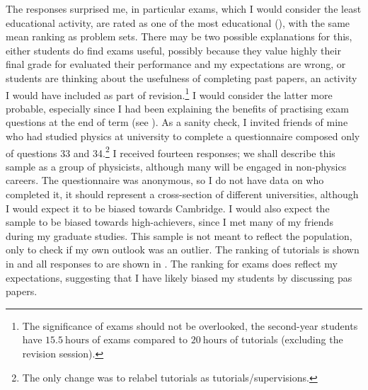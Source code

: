 The responses surprised me, in particular exams, which I would consider the least educational activity, are rated as one of the most educational (), with the same mean ranking as problem sets. There may be two possible explanations for this, either students do find exams useful, possibly because they value highly their final grade for evaluated their performance and my expectations are wrong, or students are thinking about the usefulness of completing past papers, an activity I would have included as part of revision.\footnote{The significance of exams should not be overlooked, the second-year students have $15.5~\mathrm{hours}$ of exams compared to $20~\mathrm{hours}$ of tutorials (excluding the revision session).} I would consider the latter more probable, especially since I had been explaining the benefits of practising exam questions at the end of term (see ). As a sanity check, I invited friends of mine who had studied physics at university to complete a questionnaire composed only of questions 33 and 34.\footnote{The only change was to relabel tutorials as tutorials/supervisions.} I received fourteen responses; we shall describe this sample as a group of physicists, although many will be engaged in non-physics careers. The questionnaire was anonymous, so I do not have data on who completed it, it should represent a cross-section of different universities, although I would expect it to be biased towards Cambridge. I would also expect the sample to be biased towards high-achievers, since I met many of my friends during my graduate studies. This sample is not meant to reflect the population, only to check if my own outlook was an outlier. The ranking of tutorials is shown in  and all responses to are shown in . The ranking for exams does reflect my expectations, suggesting that I have likely biased my students by discussing pas papers.
